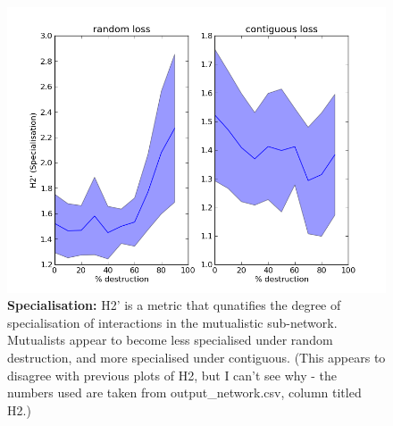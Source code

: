 \begin{figure}
		\centering      
        \includegraphics[width=\textwidth]{"comparison_plots/compare_h2_mean"}
        \caption{\textbf{Specialisation:} H2' is a metric that qunatifies the degree of specialisation of interactions in the mutualistic sub-network. Mutualists appear to become less specialised under random destruction, and more specialised under contiguous. (This appears to disagree with previous plots of H2, but I can't see why - the numbers used are taken from output\_network.csv, column titled H2.) }\label{fig:h2}
\end{figure}


